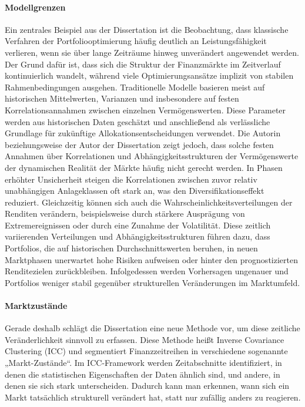\paragraph{Modellgrenzen}
Ein zentrales Beispiel aus der Dissertation ist die Beobachtung, dass klassische Verfahren der Portfoliooptimierung häufig deutlich an Leistungsfähigkeit verlieren, wenn sie über lange Zeiträume hinweg unverändert angewendet werden. Der Grund dafür ist, dass sich die Struktur der Finanzmärkte im Zeitverlauf kontinuierlich wandelt, während viele Optimierungsansätze implizit von stabilen Rahmenbedingungen ausgehen. Traditionelle Modelle basieren meist auf historischen Mittelwerten, Varianzen und insbesondere auf festen Korrelationsannahmen zwischen einzelnen Vermögenswerten. Diese Parameter werden aus historischen Daten geschätzt und anschließend als verlässliche Grundlage für zukünftige Allokationsentscheidungen verwendet. Die Autorin beziehungsweise der Autor der Dissertation zeigt jedoch, dass solche festen Annahmen über Korrelationen und Abhängigkeitsstrukturen der Vermögenswerte der dynamischen Realität der Märkte häufig nicht gerecht werden. In Phasen erhöhter Unsicherheit steigen die Korrelationen zwischen zuvor relativ unabhängigen Anlageklassen oft stark an, was den Diversifikationseffekt reduziert. Gleichzeitig können sich auch die Wahrscheinlichkeitsverteilungen der Renditen verändern, beispielsweise durch stärkere Ausprägung von Extremereignissen oder durch eine Zunahme der Volatilität. Diese zeitlich variierenden Verteilungen und Abhängigkeitsstrukturen führen dazu, dass Portfolios, die auf historischen Durchschnittswerten beruhen, in neuen Marktphasen unerwartet hohe Risiken aufweisen oder hinter den prognostizierten Renditezielen zurückbleiben. Infolgedessen werden Vorhersagen ungenauer und Portfolios weniger stabil gegenüber strukturellen Veränderungen im Marktumfeld.
\paragraph{Marktzustände}
Gerade deshalb schlägt die Dissertation eine neue Methode vor, um diese zeitliche Veränderlichkeit sinnvoll zu erfassen. Diese Methode heißt Inverse Covariance Clustering (ICC) und segmentiert Finanzzeitreihen in verschiedene sogenannte „Markt-Zustände“. Im ICC-Framework werden Zeitabschnitte identifiziert, in denen die statistischen Eigenschaften der Daten ähnlich sind, und andere, in denen sie sich stark unterscheiden. Dadurch kann man erkennen, wann sich ein Markt tatsächlich strukturell verändert hat, statt nur zufällig anders zu reagieren.
